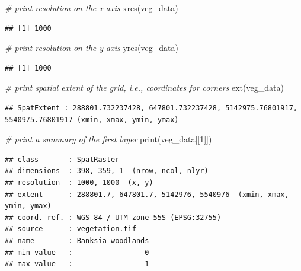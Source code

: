 \documentclass[
  12pt,
]{book}
\newenvironment{Shaded}{\begin{snugshade}}{\end{snugshade}}
\newcommand{\CommentTok}[1]{\textcolor[rgb]{0.56,0.35,0.01}{\textit{#1}}}
\newcommand{\DecValTok}[1]{\textcolor[rgb]{0.00,0.00,0.81}{#1}}
\newcommand{\FunctionTok}[1]{\textcolor[rgb]{0.00,0.00,0.00}{#1}}
\newcommand{\NormalTok}[1]{#1}
\begin{document}
\begin{Shaded}
\begin{Highlighting}[]
\CommentTok{\# print resolution on the x{-}axis}
\FunctionTok{xres}\NormalTok{(veg\_data)}
\end{Highlighting}
\end{Shaded}

\begin{verbatim}
## [1] 1000
\end{verbatim}

\begin{Shaded}
\begin{Highlighting}[]
\CommentTok{\# print resolution on the y{-}axis}
\FunctionTok{yres}\NormalTok{(veg\_data)}
\end{Highlighting}
\end{Shaded}

\begin{verbatim}
## [1] 1000
\end{verbatim}

\begin{Shaded}
\begin{Highlighting}[]
\CommentTok{\# print spatial extent of the grid, i.e., coordinates for corners}
\FunctionTok{ext}\NormalTok{(veg\_data)}
\end{Highlighting}
\end{Shaded}

\begin{verbatim}
## SpatExtent : 288801.732237428, 647801.732237428, 5142975.76801917, 5540975.76801917 (xmin, xmax, ymin, ymax)
\end{verbatim}

\begin{Shaded}
\begin{Highlighting}[]
\CommentTok{\# print a summary of the first layer}
\FunctionTok{print}\NormalTok{(veg\_data[[}\DecValTok{1}\NormalTok{]])}
\end{Highlighting}
\end{Shaded}

\begin{verbatim}
## class       : SpatRaster 
## dimensions  : 398, 359, 1  (nrow, ncol, nlyr)
## resolution  : 1000, 1000  (x, y)
## extent      : 288801.7, 647801.7, 5142976, 5540976  (xmin, xmax, ymin, ymax)
## coord. ref. : WGS 84 / UTM zone 55S (EPSG:32755) 
## source      : vegetation.tif 
## name        : Banksia woodlands 
## min value   :                 0 
## max value   :                 1
\end{verbatim}
\end{document}
